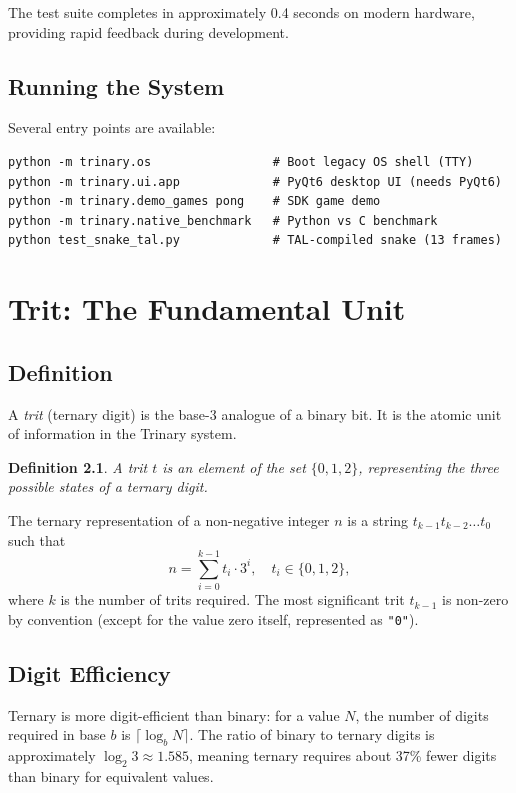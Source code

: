 \documentclass[10pt,a4paper,twoside]{book}
\newtheorem{definition}{Definition}[chapter]
\begin{document}
The test suite completes in approximately 0.4 seconds on modern hardware, providing
rapid feedback during development.

\section{Running the System}

Several entry points are available:

\begin{verbatim}
python -m trinary.os                 # Boot legacy OS shell (TTY)
python -m trinary.ui.app             # PyQt6 desktop UI (needs PyQt6)
python -m trinary.demo_games pong    # SDK game demo
python -m trinary.native_benchmark   # Python vs C benchmark
python test_snake_tal.py             # TAL-compiled snake (13 frames)
\end{verbatim}

\chapter{Trit: The Fundamental Unit}
\label{ch:trit}

\section{Definition}

A \emph{trit} (ternary digit) is the base-3 analogue of a binary bit. It is the atomic
unit of information in the Trinary system.

\begin{definition}
A trit $t$ is an element of the set $\{0,1,2\}$, representing the three possible states
of a ternary digit.
\end{definition}

The ternary representation of a non-negative integer $n$ is a string
$t_{k-1}t_{k-2}\ldots t_0$ such that
\[
n = \sum_{i=0}^{k-1} t_i \cdot 3^i,\quad t_i \in \{0,1,2\},
\]
where $k$ is the number of trits required. The most significant trit $t_{k-1}$ is
non-zero by convention (except for the value zero itself, represented as \texttt{"0"}).

\section{Digit Efficiency}

Ternary is more digit-efficient than binary: for a value $N$, the number of digits
required in base $b$ is $\lceil \log_b N \rceil$. The ratio of binary to ternary digits
is approximately $\log_2 3 \approx 1.585$, meaning ternary requires about 37\% fewer
digits than binary for equivalent values.
\end{document}
